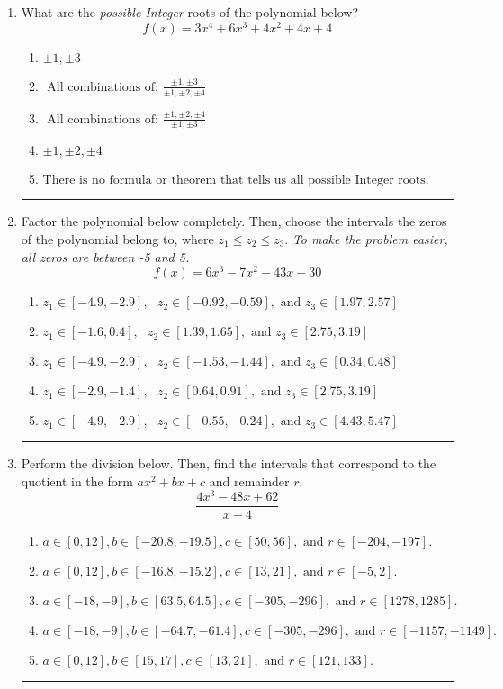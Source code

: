 \documentclass[14pt]{extbook}
\newcommand{\litem}[1]{\item#1\hspace*{-1cm}\rule{\textwidth}{0.4pt}}
\begin{document}
\begin{enumerate}
{\begin{enumerate}[label=\Alph*.]
\end{enumerate} }
\litem{
What are the \textit{possible Integer} roots of the polynomial below?\[ f(x) = 3x^{4} +6 x^{3} +4 x^{2} +4 x + 4 \]\begin{enumerate}[label=\Alph*.]
\item \( \pm 1,\pm 3 \)
\item \( \text{ All combinations of: }\frac{\pm 1,\pm 3}{\pm 1,\pm 2,\pm 4} \)
\item \( \text{ All combinations of: }\frac{\pm 1,\pm 2,\pm 4}{\pm 1,\pm 3} \)
\item \( \pm 1,\pm 2,\pm 4 \)
\item \( \text{There is no formula or theorem that tells us all possible Integer roots.} \)

\end{enumerate} }
\litem{
Factor the polynomial below completely. Then, choose the intervals the zeros of the polynomial belong to, where $z_1 \leq z_2 \leq z_3$. \textit{To make the problem easier, all zeros are between -5 and 5.}\[ f(x) = 6x^{3} -7 x^{2} -43 x + 30 \]\begin{enumerate}[label=\Alph*.]
\item \( z_1 \in [-4.9, -2.9], \text{   }  z_2 \in [-0.92, -0.59], \text{   and   } z_3 \in [1.97, 2.57] \)
\item \( z_1 \in [-1.6, 0.4], \text{   }  z_2 \in [1.39, 1.65], \text{   and   } z_3 \in [2.75, 3.19] \)
\item \( z_1 \in [-4.9, -2.9], \text{   }  z_2 \in [-1.53, -1.44], \text{   and   } z_3 \in [0.34, 0.48] \)
\item \( z_1 \in [-2.9, -1.4], \text{   }  z_2 \in [0.64, 0.91], \text{   and   } z_3 \in [2.75, 3.19] \)
\item \( z_1 \in [-4.9, -2.9], \text{   }  z_2 \in [-0.55, -0.24], \text{   and   } z_3 \in [4.43, 5.47] \)

\end{enumerate} }
\litem{
Perform the division below. Then, find the intervals that correspond to the quotient in the form $ax^2+bx+c$ and remainder $r$.\[ \frac{4x^{3} -48 x + 62}{x + 4} \]\begin{enumerate}[label=\Alph*.]
\item \( a \in [0, 12], b \in [-20.8, -19.5], c \in [50, 56], \text{ and } r \in [-204, -197]. \)
\item \( a \in [0, 12], b \in [-16.8, -15.2], c \in [13, 21], \text{ and } r \in [-5, 2]. \)
\item \( a \in [-18, -9], b \in [63.5, 64.5], c \in [-305, -296], \text{ and } r \in [1278, 1285]. \)
\item \( a \in [-18, -9], b \in [-64.7, -61.4], c \in [-305, -296], \text{ and } r \in [-1157, -1149]. \)
\item \( a \in [0, 12], b \in [15, 17], c \in [13, 21], \text{ and } r \in [121, 133]. \)


\end{enumerate}}
\end{enumerate}
\end{document}
